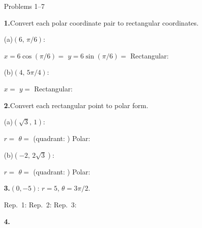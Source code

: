 \documentclass[10pt]{article}
\begin{document}
\namedateperiod

\vspace{0.10in}

\begin{notesbox}{Problems 1--7}

\textbf{1.}\quad Convert each polar coordinate pair to rectangular coordinates.

\vspace{4pt}
(a)\quad $(6,\, \pi/6)$:

\vspace{4pt}
$x = 6\cos(\pi/6) = $  \qquad
$y = 6\sin(\pi/6) = $  \qquad
Rectangular: 

\vspace{8pt}
(b)\quad $(4,\, 5\pi/4)$:

\vspace{4pt}
$x = $  \qquad
$y = $  \qquad
Rectangular: 

\vspace{0.14in}
\textbf{2.}\quad Convert each rectangular point to polar form.

\vspace{4pt}
(a)\quad $(\sqrt{3},\, 1)$:

\vspace{4pt}
$r = $  \qquad
$\theta = $  (quadrant: ) \qquad
Polar: 

\vspace{8pt}
(b)\quad $(-2,\, 2\sqrt{3})$:

\vspace{4pt}
$r = $  \qquad
$\theta = $ 
(quadrant: ) \qquad
Polar: 

\vspace{0.14in}
\textbf{3.}\quad $(0,-5)$: $r = 5$, $\theta = 3\pi/2$.

\vspace{4pt}
Rep.\ 1:  \quad
Rep.\ 2:  \quad
Rep.\ 3: 

\vspace{0.14in}
\textbf{4.}\quad


\end{notesbox}
\end{document}
